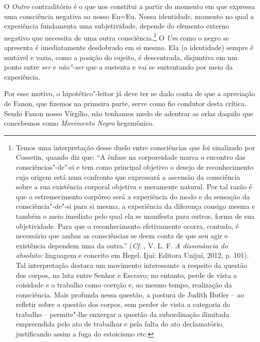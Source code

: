 O \emph{Outro} contraditório é o que nos constitui a partir do momento
em que expressa uma consciência negativa ao nosso Eu=Eu. Nossa
identidade, momento no qual a experiência fundamenta uma subjetividade,
depende do elemento externo negativo que necessita de uma outra
consciência.\footnote{Temos uma interpretação desse duelo entre
  consciências que foi sinalizado por Cossetin, quando diz que: ``A
  ênfase na corporeidade marca o encontro das consciências"-de"-si e tem
  como principal objetivo o desejo de reconhecimento cuja origem está
  num confronto que expressará a ascensão da consciência sobre a sua
  existência corporal objetiva e meramente natural. Por tal razão é que
  o estremecimento corpóreo será a experiência do modo e da sensação da
  consciência"-de"-si para si mesma, a experiência da diferença consigo
  mesma e também o meio imediato pelo qual ela se manifesta para outros,
  forma de sua objetividade. Para que o reconhecimento efetivamente
  ocorra, contudo, é necessário que ambas as consciências se deem conta
  de que seu agir e existência dependem uma da outra.'' (\emph{Cf}. ,
  V. L. F. \emph{A dissonância do absoluto:} linguagem e conceito em
  Hegel. Ijuí: Editora Unijuí, 2012, p. 101). Tal interpretação destaca
  um movimento interessante a respeito da questão dos corpos, na luta
  entre Senhor e Escravo; no entanto, perde de vista a coisidade e o
  trabalho como coerção e, ao mesmo tempo, realização da consciência.
  Mais profunda nessa questão, a postura de Judith Butler -- ao refletir
  sobre a questão dos corpos, sem perder de vista a categoria do
  trabalho -- permite"-lhe enxergar a questão da subordinação ilimitada
  empreendida pelo ato de trabalhar e pela falta do ato declamatório,
  justificando assim a fuga do estoicismo etc.} O \emph{Um} como o
negro se apresenta é imediatamente desdobrado em si mesmo. Ela (a
identidade) sempre é mutável e vazia, como a posição do sujeito, é
descentrada, disjuntiva em um ponto entre \emph{ser} e \emph{não"-ser}
que a sustenta e vai se sustentando por meio da experiência.

Por esse motivo, o hipotético"-leitor já deve ter se dado conta de que a
apreciação de Fanon, que fizemos na primeira parte, serve como fio
condutor desta crítica. Sendo Fanon nosso Vírgílio, não tenhamos medo de
adentrar as orlas daquilo que concebemos como \emph{Movimento Negro}
hegemônico.

